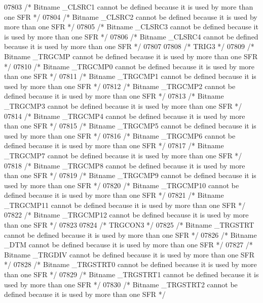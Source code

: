 \begin{DoxyCode}
07803 \textcolor{comment}{/* Bitname \_CLSRC1 cannot be defined because it is used by more than one SFR */}
07804 \textcolor{comment}{/* Bitname \_CLSRC2 cannot be defined because it is used by more than one SFR */}
07805 \textcolor{comment}{/* Bitname \_CLSRC3 cannot be defined because it is used by more than one SFR */}
07806 \textcolor{comment}{/* Bitname \_CLSRC4 cannot be defined because it is used by more than one SFR */}
07807 
07808 \textcolor{comment}{/* TRIG3 */}
07809 \textcolor{comment}{/* Bitname \_TRGCMP cannot be defined because it is used by more than one SFR */}
07810 \textcolor{comment}{/* Bitname \_TRGCMP0 cannot be defined because it is used by more than one SFR */}
07811 \textcolor{comment}{/* Bitname \_TRGCMP1 cannot be defined because it is used by more than one SFR */}
07812 \textcolor{comment}{/* Bitname \_TRGCMP2 cannot be defined because it is used by more than one SFR */}
07813 \textcolor{comment}{/* Bitname \_TRGCMP3 cannot be defined because it is used by more than one SFR */}
07814 \textcolor{comment}{/* Bitname \_TRGCMP4 cannot be defined because it is used by more than one SFR */}
07815 \textcolor{comment}{/* Bitname \_TRGCMP5 cannot be defined because it is used by more than one SFR */}
07816 \textcolor{comment}{/* Bitname \_TRGCMP6 cannot be defined because it is used by more than one SFR */}
07817 \textcolor{comment}{/* Bitname \_TRGCMP7 cannot be defined because it is used by more than one SFR */}
07818 \textcolor{comment}{/* Bitname \_TRGCMP8 cannot be defined because it is used by more than one SFR */}
07819 \textcolor{comment}{/* Bitname \_TRGCMP9 cannot be defined because it is used by more than one SFR */}
07820 \textcolor{comment}{/* Bitname \_TRGCMP10 cannot be defined because it is used by more than one SFR */}
07821 \textcolor{comment}{/* Bitname \_TRGCMP11 cannot be defined because it is used by more than one SFR */}
07822 \textcolor{comment}{/* Bitname \_TRGCMP12 cannot be defined because it is used by more than one SFR */}
07823 
07824 \textcolor{comment}{/* TRGCON3 */}
07825 \textcolor{comment}{/* Bitname \_TRGSTRT cannot be defined because it is used by more than one SFR */}
07826 \textcolor{comment}{/* Bitname \_DTM cannot be defined because it is used by more than one SFR */}
07827 \textcolor{comment}{/* Bitname \_TRGDIV cannot be defined because it is used by more than one SFR */}
07828 \textcolor{comment}{/* Bitname \_TRGSTRT0 cannot be defined because it is used by more than one SFR */}
07829 \textcolor{comment}{/* Bitname \_TRGSTRT1 cannot be defined because it is used by more than one SFR */}
07830 \textcolor{comment}{/* Bitname \_TRGSTRT2 cannot be defined because it is used by more than one SFR */}

\end{DoxyCode}
